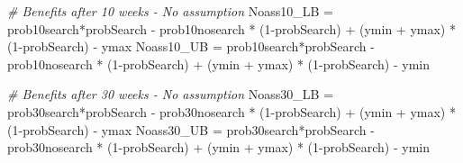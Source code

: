 \documentclass[
]{article}
\newenvironment{Shaded}{\begin{snugshade}}{\end{snugshade}}
\newcommand{\CommentTok}[1]{\textcolor[rgb]{0.56,0.35,0.01}{\textit{#1}}}
\newcommand{\DecValTok}[1]{\textcolor[rgb]{0.00,0.00,0.81}{#1}}
\newcommand{\FunctionTok}[1]{\textcolor[rgb]{0.00,0.00,0.00}{#1}}
\newcommand{\NormalTok}[1]{#1}
\newcommand{\OtherTok}[1]{\textcolor[rgb]{0.56,0.35,0.01}{#1}}
\newcommand{\SpecialCharTok}[1]{\textcolor[rgb]{0.00,0.00,0.00}{#1}}
\begin{document}
\begin{Shaded}
\end{Shaded}

\begin{Shaded}
\begin{Highlighting}[]
\CommentTok{\# Benefits after 10 weeks {-} No assumption}
\NormalTok{Noass10\_LB }\OtherTok{=}\NormalTok{ prob10search}\SpecialCharTok{*}\NormalTok{probSearch }\SpecialCharTok{{-}}\NormalTok{ prob10nosearch }\SpecialCharTok{*}\NormalTok{ (}\DecValTok{1}\SpecialCharTok{{-}}\NormalTok{probSearch) }\SpecialCharTok{+}\NormalTok{ (ymin }\SpecialCharTok{+}\NormalTok{ ymax) }\SpecialCharTok{*}\NormalTok{ (}\DecValTok{1}\SpecialCharTok{{-}}\NormalTok{probSearch) }\SpecialCharTok{{-}}\NormalTok{ ymax}
\NormalTok{Noass10\_UB }\OtherTok{=}\NormalTok{ prob10search}\SpecialCharTok{*}\NormalTok{probSearch }\SpecialCharTok{{-}}\NormalTok{ prob10nosearch }\SpecialCharTok{*}\NormalTok{ (}\DecValTok{1}\SpecialCharTok{{-}}\NormalTok{probSearch) }\SpecialCharTok{+}\NormalTok{ (ymin }\SpecialCharTok{+}\NormalTok{ ymax) }\SpecialCharTok{*}\NormalTok{ (}\DecValTok{1}\SpecialCharTok{{-}}\NormalTok{probSearch) }\SpecialCharTok{{-}}\NormalTok{ ymin}

\CommentTok{\# Benefits after 30 weeks {-} No assumption}
\NormalTok{Noass30\_LB }\OtherTok{=}\NormalTok{ prob30search}\SpecialCharTok{*}\NormalTok{probSearch }\SpecialCharTok{{-}}\NormalTok{ prob30nosearch }\SpecialCharTok{*}\NormalTok{ (}\DecValTok{1}\SpecialCharTok{{-}}\NormalTok{probSearch) }\SpecialCharTok{+}\NormalTok{ (ymin }\SpecialCharTok{+}\NormalTok{ ymax) }\SpecialCharTok{*}\NormalTok{ (}\DecValTok{1}\SpecialCharTok{{-}}\NormalTok{probSearch) }\SpecialCharTok{{-}}\NormalTok{ ymax}
\NormalTok{Noass30\_UB }\OtherTok{=}\NormalTok{ prob30search}\SpecialCharTok{*}\NormalTok{probSearch }\SpecialCharTok{{-}}\NormalTok{ prob30nosearch }\SpecialCharTok{*}\NormalTok{ (}\DecValTok{1}\SpecialCharTok{{-}}\NormalTok{probSearch) }\SpecialCharTok{+}\NormalTok{ (ymin }\SpecialCharTok{+}\NormalTok{ ymax) }\SpecialCharTok{*}\NormalTok{ (}\DecValTok{1}\SpecialCharTok{{-}}\NormalTok{probSearch) }\SpecialCharTok{{-}}\NormalTok{ ymin}
\end{Highlighting}
\end{Shaded}
\end{document}
